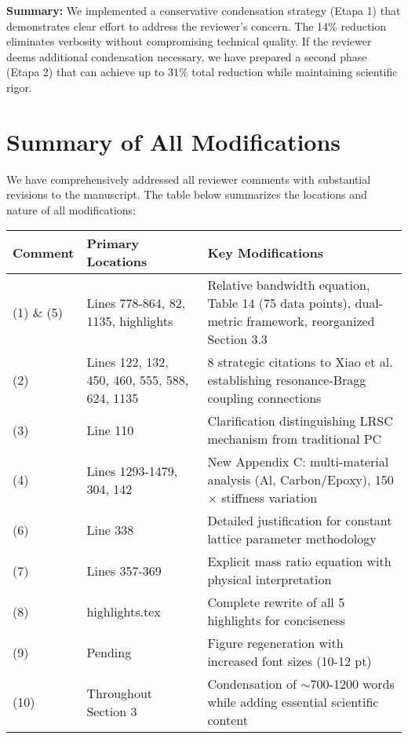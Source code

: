 \documentclass[11pt,a4paper]{article}
\begin{document}
\textbf{Summary:} We implemented a conservative condensation strategy (Etapa 1) that demonstrates clear effort to address the reviewer's concern. The 14\% reduction eliminates verbosity without compromising technical quality. If the reviewer deems additional condensation necessary, we have prepared a second phase (Etapa 2) that can achieve up to 31\% total reduction while maintaining scientific rigor.

\newpage

\section*{Summary of All Modifications}

We have comprehensively addressed all reviewer comments with substantial revisions to the manuscript. The table below summarizes the locations and nature of all modifications:

\begin{table}[h]
\centering
\small
\begin{tabular}{|p{2cm}|p{4cm}|p{7cm}|}
\hline
\textbf{Comment} & \textbf{Primary Locations} & \textbf{Key Modifications} \\
\hline
(1) \& (5) & Lines 778-864, 82, 1135, highlights & Relative bandwidth equation, Table 14 (75 data points), dual-metric framework, reorganized Section 3.3 \\
\hline
(2) & Lines 122, 132, 450, 460, 555, 588, 624, 1135 & 8 strategic citations to Xiao et al. establishing resonance-Bragg coupling connections \\
\hline
(3) & Line 110 & Clarification distinguishing LRSC mechanism from traditional PC \\
\hline
(4) & Lines 1293-1479, 304, 142 & New Appendix C: multi-material analysis (Al, Carbon/Epoxy), 150$\times$ stiffness variation \\
\hline
(6) & Line 338 & Detailed justification for constant lattice parameter methodology \\
\hline
(7) & Lines 357-369 & Explicit mass ratio equation with physical interpretation \\
\hline
(8) & highlights.tex & Complete rewrite of all 5 highlights for conciseness \\
\hline
(9) & Pending & Figure regeneration with increased font sizes (10-12 pt) \\
\hline
(10) & Throughout Section 3 & Condensation of $\sim$700-1200 words while adding essential scientific content \\
\hline
\end{tabular}
\end{table}
\end{document}
